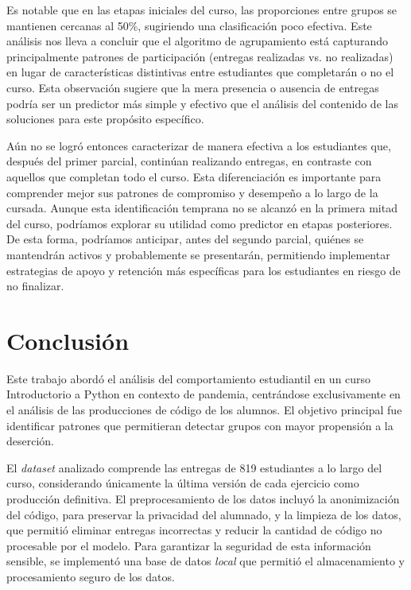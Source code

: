 \documentclass[11pt,a4paper,twoside,openany]{tesis}
\begin{document}
Es notable que en las etapas iniciales del curso, las proporciones entre grupos se mantienen cercanas al 50\%, sugiriendo una clasificación poco efectiva. Este análisis nos lleva a concluir que el algoritmo de agrupamiento está capturando principalmente patrones de participación (entregas realizadas vs. no realizadas) en lugar de características distintivas entre estudiantes que completarán o no el curso. Esta observación sugiere que la mera presencia o ausencia de entregas podría ser un predictor más simple y efectivo que el análisis del contenido de las soluciones para este propósito específico.

Aún no se logró entonces caracterizar de manera efectiva a los estudiantes que, después del primer parcial, continúan realizando entregas, en contraste con aquellos que completan todo el curso. Esta diferenciación es importante para comprender mejor sus patrones de compromiso y desempeño a lo largo de la cursada. Aunque esta identificación temprana no se alcanzó en la primera mitad del curso, podríamos explorar su utilidad como predictor en etapas posteriores. De esta forma, podríamos anticipar, antes del segundo parcial, quiénes se mantendrán activos y probablemente se presentarán, permitiendo implementar estrategias de apoyo y retención más específicas para los estudiantes en riesgo de no finalizar.

\chapter{Conclusión}

Este trabajo abordó el análisis del comportamiento estudiantil en un curso Introductorio a Python en contexto de pandemia, centrándose exclusivamente en el análisis de las producciones de código de los alumnos. El objetivo principal fue identificar patrones que permitieran detectar grupos con mayor propensión a la deserción.

El \emph{dataset} analizado comprende las entregas de 819 estudiantes a lo largo del curso, considerando únicamente la última versión de cada ejercicio como producción definitiva. El preprocesamiento de los datos incluyó la anonimización del código, para preservar la privacidad del alumnado, y la limpieza de los datos, que permitió eliminar entregas incorrectas y reducir la cantidad de código no procesable por el modelo. Para garantizar la seguridad de esta información sensible, se implementó una base de datos \emph{local} que permitió el almacenamiento y procesamiento seguro de los datos.
\end{document}
